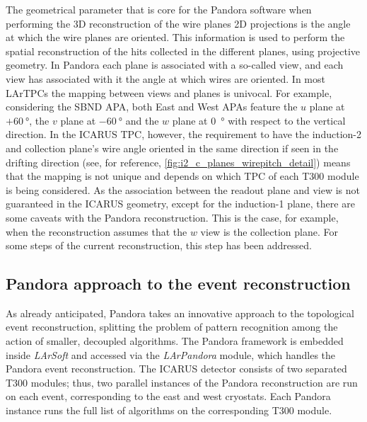 The geometrical parameter that is core for the Pandora software when performing the 3D reconstruction of the wire planes 2D projections is the angle at which the wire planes are oriented. This information is used to perform the spatial reconstruction of the hits collected in the different planes, using projective geometry. In Pandora each plane is associated with a so-called view, and each view has associated with it the angle at which wires are oriented. In most LArTPCs the mapping between views and planes is univocal. For example, considering the SBND APA, both East and West APAs feature the $u$ plane at $+\SI{60}{\degree}$, the $v$ plane at $-\SI{60}{\degree}$ and the $w$ plane at \SI{0}{\degree} with respect to the vertical direction. In the ICARUS TPC, however, the requirement to have the induction-2 and collection plane's wire angle oriented in the same direction if seen in the drifting direction (see, for reference, \autoref{fig:i2_c_planes_wirepitch_detail}) means that the mapping is not unique and depends on which TPC of each T300 module is being considered. As the association between the readout plane and view is not guaranteed in the ICARUS geometry, except for the induction-1 plane, there are some caveats with the Pandora reconstruction. This is the case, for example, when the reconstruction assumes that the $w$ view is the collection plane. For some steps of the current reconstruction, this step has been addressed. 

\subsection{Pandora approach to the event reconstruction} \label{sec:Pandora}

As already anticipated, Pandora takes an innovative approach to the topological event reconstruction, splitting the problem of pattern recognition among the action of smaller, decoupled algorithms. The Pandora framework is embedded inside \emph{LArSoft} and accessed via the \emph{LArPandora} module, which handles the Pandora event reconstruction. The ICARUS detector consists of two separated T300 modules; thus, two parallel instances of the Pandora reconstruction are run on each event, corresponding to the east and west cryostats. Each Pandora instance runs the full list of algorithms on the corresponding T300 module. 

